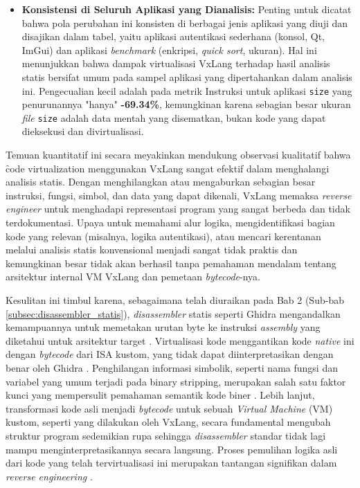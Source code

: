 \begin{itemize}
    \item \textbf{Konsistensi di Seluruh Aplikasi yang Dianalisis:}
    Penting untuk dicatat bahwa pola perubahan ini konsisten di berbagai jenis aplikasi yang diuji dan disajikan dalam tabel, yaitu aplikasi autentikasi sederhana (konsol, Qt, ImGui) dan aplikasi \textit{benchmark} (enkripsi, \textit{quick sort}, ukuran). Hal ini menunjukkan bahwa dampak virtualisasi VxLang terhadap hasil analisis statis bersifat umum pada sampel aplikasi yang dipertahankan dalam analisis ini. Pengecualian kecil adalah pada metrik Instruksi untuk aplikasi \texttt{size} yang penurunannya "hanya" \textbf{-69.34\%}, kemungkinan karena sebagian besar ukuran \textit{file} \texttt{size} adalah data mentah yang disematkan, bukan kode yang dapat dieksekusi dan divirtualisasi.

\end{itemize}

Temuan kuantitatif ini secara meyakinkan mendukung observasi kualitatif bahwa \f{code virtualization} menggunakan VxLang sangat efektif dalam menghalangi analisis statis. Dengan menghilangkan atau mengaburkan sebagian besar instruksi, fungsi, simbol, dan data yang dapat dikenali, VxLang memaksa \textit{reverse engineer} untuk menghadapi representasi program yang sangat berbeda dan tidak terdokumentasi. Upaya untuk memahami alur logika, mengidentifikasi bagian kode yang relevan (misalnya, logika autentikasi), atau mencari kerentanan melalui analisis statis konvensional menjadi sangat tidak praktis dan kemungkinan besar tidak akan berhasil tanpa pemahaman mendalam tentang arsitektur internal VM VxLang dan pemetaan \textit{bytecode}-nya.

Kesulitan ini timbul karena, sebagaimana telah diuraikan pada Bab 2 (Sub-bab \ref{subsec:disassembler_statis}), \textit{disassembler} statis seperti Ghidra mengandalkan kemampuannya untuk memetakan urutan byte ke instruksi \textit{assembly} yang diketahui untuk arsitektur target \cite{Sikorski2012, Eilam2011}. Virtualisasi kode menggantikan kode \textit{native} ini dengan \textit{bytecode} dari ISA kustom, yang tidak dapat diinterpretasikan dengan benar oleh Ghidra \cite{Ko2007}.  Penghilangan informasi simbolik, seperti nama fungsi dan variabel yang umum terjadi pada binary stripping, merupakan salah satu faktor kunci yang mempersulit pemahaman semantik kode biner \cite{Gao2024StrippedBinaries}. Lebih lanjut, transformasi kode asli menjadi \textit{bytecode} untuk sebuah \textit{Virtual Machine} (VM) kustom, seperti yang dilakukan oleh VxLang, secara fundamental mengubah struktur program sedemikian rupa sehingga \textit{disassembler} standar tidak lagi mampu menginterpretasikannya secara langsung. Proses pemulihan logika asli dari kode yang telah tervirtualisasi ini merupakan tantangan signifikan dalam \textit{reverse engineering} \cite{Salwan2018SymbolicDeobfuscation}.

